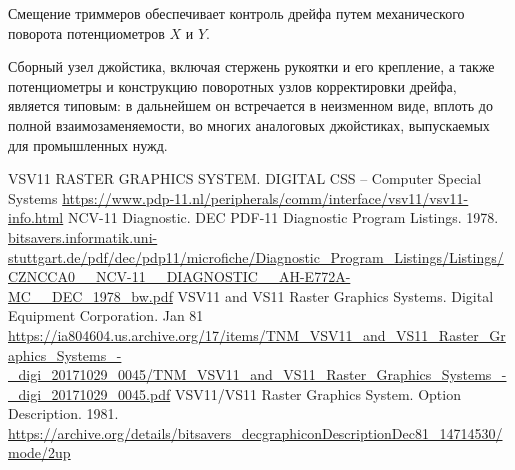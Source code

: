 \documentclass[11pt, a4paper]{article}
\begin{document}
Смещение триммеров обеспечивает контроль дрейфа путем механического поворота потенциометров $X$ и $Y$. 

Сборный узел джойстика, включая стержень рукоятки и его крепление, а также потенциометры и конструкцию поворотных узлов корректировки дрейфа, является типовым: в дальнейшем он встречается в неизменном виде, вплоть до полной взаимозаменяемости, во многих аналоговых джойстиках, выпускаемых для промышленных нужд.

\begin{thebibliography}{9}
 VSV11 RASTER GRAPHICS SYSTEM. D\textbar I\textbar G\textbar I\textbar T\textbar A\textbar L CSS -- Computer Special Systems \url{https://www.pdp-11.nl/peripherals/comm/interface/vsv11/vsv11-info.html}
 NCV-11 Diagnostic. DEC PDF-11 Diagnostic Program Listings. 1978. \url{bitsavers.informatik.uni-stuttgart.de/pdf/dec/pdp11/microfiche/Diagnostic_Program_Listings/Listings/CZNCCA0__NCV-11__DIAGNOSTIC__AH-E772A-MC__DEC_1978_bw.pdf}
 VSV11 and VS11 Raster Graphics Systems. Digital Equipment Corporation. Jan 81 \url{https://ia804604.us.archive.org/17/items/TNM_VSV11_and_VS11_Raster_Graphics_Systems_-_digi_20171029_0045/TNM_VSV11_and_VS11_Raster_Graphics_Systems_-_digi_20171029_0045.pdf}
 VSV11/VS11 Raster Graphics System. Option Description. 1981. \url{https://archive.org/details/bitsavers_decgraphiconDescriptionDec81_14714530/mode/2up}
\end{thebibliography}
\end{document}
